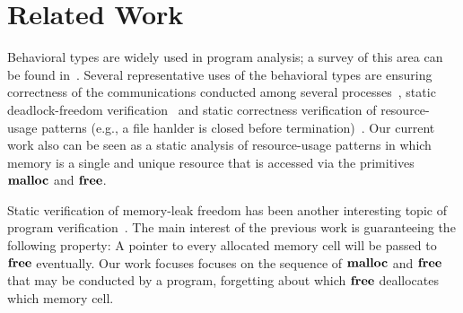 \section{Related Work}\label{sec:relatedwork}

Behavioral types are widely used in program analysis; a survey of this
area can be found in~\cite{DBLP:journals/csur/HuttelLVCCDMPRT16}.
Several representative uses of the behavioral types are ensuring
correctness of the communications conducted among several
processes~\cite{DBLP:journals/corr/abs-1208-6483,DBLP:conf/popl/HondaYC08,DBLP:journals/tcs/CairesV10,DBLP:journals/tcs/IgarashiK04},
static deadlock-freedom
verification~\cite{DBLP:conf/concur/Kobayashi06,DBLP:journals/acta/Kobayashi05}
and static correctness verification of resource-usage patterns (e.g., a
file hanlder is closed before
termination)~\cite{DBLP:journals/lmcs/KobayashiSW06,DBLP:journals/toplas/IgarashiK05}.
Our current work also can be seen as a static analysis of resource-usage
patterns in which memory is a single and unique resource that is
accessed via the primitives $\mathbf{malloc}$ and $\mathbf{free}$.

Static verification of memory-leak freedom has been another interesting
topic of program
verification~\cite{DBLP:conf/aplas/SuenagaK09,DBLP:conf/pldi/HeineL03,DBLP:conf/sigsoft/XieA05,DBLP:journals/scp/SwamyHMGJ06,DBLP:conf/sas/OrlovichR06,DBLP:conf/issta/SuiYX12}.
The main interest of the previous work is guaranteeing the following
property: A pointer to every allocated memory cell will be passed to
$\mathbf{free}$ eventually.  Our work focuses focuses on the sequence of
$\mathbf{malloc}$ and $\mathbf{free}$ that may be conducted by a program, forgetting
about which $\mathbf{free}$ deallocates which memory cell.


